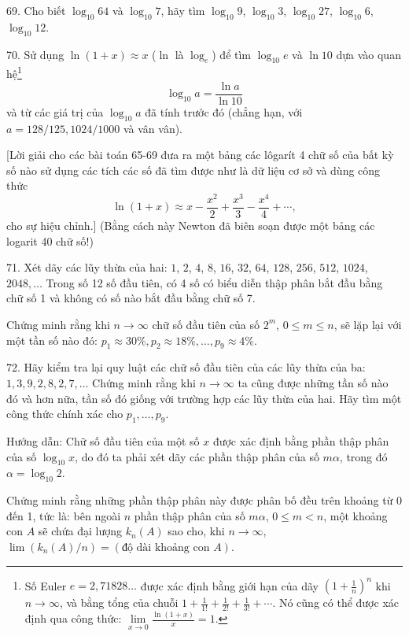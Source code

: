 \begin{problem}{69.}
	Cho biết $\log_{10} 64$ và $\log_{10} 7$, hãy tìm $\log_{10} 9$, $\log_{10} 3$, $\log_{10} 27$, $\log_{10} 6$, $\log_{10} 12$.
\end{problem}

\begin{problem}{70.}
	Sử dụng $\ln(1+x)\approx x$ ($\ln$ là $\log_e$) để tìm $\log_{10} e$ và $\ln 10$ dựa vào quan hệ\footnote{Số Euler $e=2,71828\dots$ được xác định bằng giới hạn của dãy $\left(1+\frac{1}{n}\right)^n$ khi $n\to \infty$, và bằng tổng của chuỗi $1+\frac{1}{1!}+\frac{1}{2!}+\frac{1}{3!}+\dotsb$. Nó cũng có thể được xác định qua công thức: $\lim\limits_{x\to 0}\frac{\ln(1+x)}{x} = 1$.}
	\begin{equation*}
		\log_{10} a=\frac{\ln a}{\ln 10}
	\end{equation*} 
	và từ các giá trị của $\log_{10} a$ đã tính trước đó (chẳng hạn, với $a=128/125, 1024/1000$ và vân vân).

	[Lời giải cho các bài toán 65-69 đưa ra một bảng các lôgarít 4 chữ số của bất kỳ số nào sử dụng các tích các số đã tìm được như là dữ liệu cơ sở và dùng công thức
	\begin{equation*}
		\ln (1+x) \approx x-\frac{x^2}{2}+\frac{x^3}{3}-\frac{x^4}{4}+\dotsb,
	\end{equation*}
	cho sự hiệu chỉnh.] (Bằng cách này Newton đã biên soạn được một bảng các logarit 40 chữ số!)
\end{problem}

\begin{problem}{71.}
	Xét dãy các lũy thừa của hai: $1$, $2$, $4$, $8$, $16$, $32$, $64$, $128$, $256$, $512$, $1024$, $2048, \dotsc$ Trong số 12 số đầu tiên, có 4 số có biểu diễn thập phân bắt đầu bằng chữ số 1 và không có số nào bắt đầu bằng chữ số 7.

	Chứng minh rằng khi $n\to \infty$ chữ số đầu tiên của số $2^m$, $0\leqslant m\leqslant n$, sẽ lặp lại với một tần số nào đó: 
	$p_1 \approx 30\%, p_2 \approx 18\%, \dotsc, p_9 \approx 4\%$.
\end{problem}

\begin{problem}{72.}
	Hãy kiểm tra lại quy luật các chữ số đầu tiên của các lũy thừa của ba: $1,
	3, 9, 2, 8, 2, 7, \dotsc$ Chứng minh rằng khi $n\rightarrow \infty$ ta cũng được những tần số nào đó và hơn nữa, tần số đó giống với trường hợp các lũy thừa của hai. Hãy tìm một công thức chính xác cho $p_1, \dotsc, p_9$.

	\begin{note}{Hướng dẫn:}
		Chữ số đầu tiên của một số $x$ được xác định bằng phần thập phân của số $\log_{10} x$, do đó ta phải xét dãy các phần thập phân của số $m \alpha$, trong đó $\alpha=\log_{10} 2$.
	\end{note}
	Chứng minh rằng những phần thập phân này được phân bố đều trên khoảng từ 0 đến 1, tức là: bên ngoài $n$ phần thập phân của số $m \alpha$, $0\leqslant m<n$, một khoảng con $A$ sẽ chứa đại lượng $k_n(A)$ sao cho, khi $n \to \infty$, $\lim(k_n(A)/n)=(\text{độ dài khoảng con $A$})$.
\end{problem}

